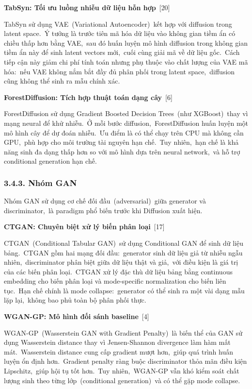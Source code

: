 \textbf{TabSyn: Tối ưu luồng nhiễu dữ liệu hỗn hợp}~{[}20{]}

TabSyn sử dụng VAE~(Variational Autoencoder)~kết hợp với diffusion trong latent space.~Ý tưởng là trước tiên mã hóa dữ liệu vào không gian tiềm ẩn có chiều thấp hơn bằng VAE,~sau đó huấn luyện mô hình diffusion trong không gian tiềm ẩn này để sinh latent vectors mới,~cuối cùng giải mã về dữ liệu gốc.~Cách tiếp cận này giảm chi phí tính toán nhưng phụ thuộc vào chất lượng của VAE mã hóa:~nếu VAE không nắm bắt đầy đủ phân phối trong latent space,~diffusion cũng không thể sinh ra mẫu chính xác.

\textbf{ForestDiffusion: Tích hợp thuật toán dạng cây}~{[}6{]}

ForestDiffusion sử dụng Gradient Boosted Decision Trees~(như XGBoost)~thay vì mạng neural để khử nhiễu.~Ở mỗi bước diffusion,~ForestDiffusion huấn luyện một mô hình cây để dự đoán nhiễu.~Ưu điểm là có thể chạy trên CPU mà không cần GPU,~phù hợp cho môi trường tài nguyên hạn chế.~Tuy nhiên,~hạn chế là khả năng sinh đa dạng thấp hơn so với mô hình dựa trên neural network,~và hỗ trợ conditional generation hạn chế.

\subsubsection{3.4.3. Nhóm GAN}\label{nhuxf3m-gan}

Nhóm GAN sử dụng cơ chế đối đầu~(adversarial)~giữa generator và discriminator,~là paradigm phổ biến trước khi Diffusion xuất hiện.

\textbf{CTGAN: Chuyên biệt xử lý biến phân loại}~{[}17{]}

CTGAN~(Conditional Tabular GAN)~sử dụng Conditional GAN để sinh dữ liệu bảng.~CTGAN gồm hai mạng đối đầu:~generator sinh dữ liệu giả từ nhiễu ngẫu nhiên,~discriminator phân biệt giữa dữ liệu thật và giả,~với điều kiện là giá trị của các biến phân loại.~CTGAN xử lý đặc thù dữ liệu bảng bằng continuous embedding cho biến phân loại và mode-specific normalization cho biến liên tục.~Hạn chế chính là mode collapse:~generator có thể sinh ra một vài dạng mẫu lặp lại,~không bao phủ toàn bộ phân phối thực.

\textbf{WGAN-GP: Mô hình đối sánh baseline}~{[}4{]}

WGAN-GP~(Wasserstein GAN with Gradient Penalty)~là biến thể của GAN sử dụng Wasserstein distance thay vì Jensen-Shannon divergence làm hàm mất mát.~Wasserstein distance cung cấp gradient mượt hơn,~giúp quá trình huấn luyện ổn định hơn.~Gradient penalty ràng buộc discriminator thỏa mãn điều kiện Lipschitz,~giúp hội tụ tốt hơn.~Tuy nhiên,~WGAN-GP vẫn khó kiểm soát chất lượng sinh theo từng lớp~(conditional generation)~và có thể gặp mode collapse.

